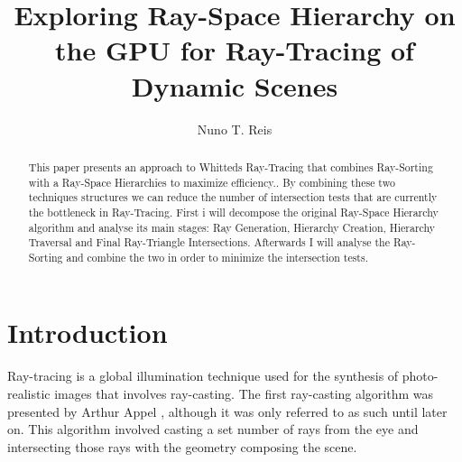 \documentclass{llncs}
\begin{document}
%

%
\mainmatter              %
%

%
\title{Exploring Ray-Space Hierarchy on the GPU for Ray-Tracing of Dynamic Scenes}
%
%

%
\author{Nuno T. Reis}
%
%
%

%
%

\maketitle              %

\begin{abstract}

This paper presents an approach to Whitteds Ray-Tracing that combines Ray-Sorting with a Ray-Space Hierarchies to maximize efficiency.. 
By combining these two techniques structures we can reduce the number of intersection tests that are currently the bottleneck in Ray-Tracing. 
First i will decompose the original Ray-Space Hierarchy algorithm and analyse its main stages: Ray Generation,  Hierarchy Creation, Hierarchy Traversal and Final Ray-Triangle Intersections. Afterwards I will analyse the Ray-Sorting and combine the two in order to minimize the intersection tests.


\end{abstract}

\newpage

%
\section{Introduction}
%

Ray-tracing is a global illumination technique used for the synthesis of photo-realistic images that involves ray-casting.
The first ray-casting algorithm was presented by Arthur Appel \cite{Appel68}, although it was only referred to as such until later on. 
This algorithm involved casting a set number of rays from the eye and intersecting those rays with the geometry composing the scene. 
\end{document}
